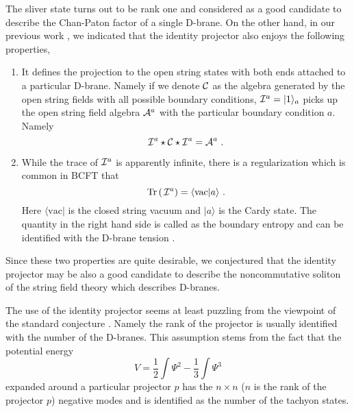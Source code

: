 \documentclass[a4paper,12pt]{article}
\begin{document}
The sliver state turns out to be
rank one and  considered as
a good candidate to describe the Chan-Paton factor of
a single D-brane.
On the other hand, in our previous work \cite{r-Matsuo2}, 
we indicated that the identity projector also enjoys
the following properties,
\begin{enumerate}
 \item It defines the projection to the open string states with
       both ends attached to a particular D-brane.  Namely if we
       denote ${\cal C}$ as the algebra generated by the 
       open string fields with all possible boundary conditions,
       ${\cal I}^a=|1\rangle_a$ picks up the open string field algebra
       ${\cal A}^a$ with the particular boundary condition $a$.  Namely
\begin{equation}\label{e-identity_projector}
 {\cal I}^a\star {\cal C} \star{\cal I}^a = {\cal A}^a\,\,.
\end{equation}
 \item While the trace of ${\cal I}^a$ is apparently infinite, there is
       a regularization which is common in BCFT that
\begin{equation}
 \mbox{Tr}\,(\,{\cal I}^a) = \langle\mbox{vac} |a\rangle\,\,.
\end{equation}
Here $\langle \mbox{vac}|$ is the closed string vacuum
and $|a\rangle$ is the Cardy state.  The quantity 
in the right hand side is called as the boundary entropy
and can be identified with the D-brane tension \cite{r-HKMS}.
\end{enumerate}
Since these two properties are quite desirable, we
conjectured that the identity projector 
may be also a good candidate to 
describe the noncommutative soliton of the string 
field theory which describes D-branes.  

The use of the identity projector seems at least
puzzling from the viewpoint of
the standard conjecture \cite{r-RSZ2, r-RSZ3, r-GT1, r-RSZ4, r-GT2}.
Namely the rank of the projector is usually 
identified with the number of the D-branes.
This assumption stems from the fact that the potential energy 
\begin{equation}\label{e-potential}
 V=\frac{1}{2}\int \Psi^2 -\frac{1}{3}\int \Psi^3
\end{equation}
expanded around a particular projector $p$
has the $n\times n$ ($n$ is the rank of the projector $p$) 
negative modes and is identified as the number of
the tachyon states.  
\end{document}
